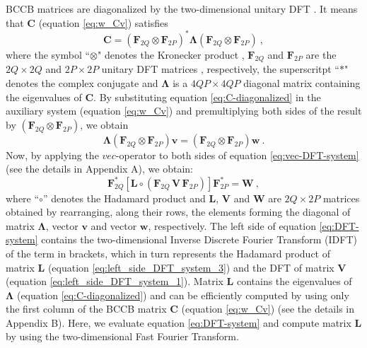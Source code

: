 \documentclass[manuscript,revised]{geophysics}
\begin{document}
BCCB matrices are diagonalized by the two-dimensional unitary DFT 
\citep[][ p. 185]{davis1979}. It means that $\mathbf{C}$ (equation \ref{eq:w_Cv}) 
satisfies 
\begin{equation}
\mathbf{C} = 
\left(\mathbf{F}_{2Q} \otimes \mathbf{F}_{2P} \right)^{\ast} 
\boldsymbol{\Lambda}
\left(\mathbf{F}_{2Q} \otimes \mathbf{F}_{2P} \right) \: ,
\label{eq:C-diagonalized}
\end{equation}
where the symbol ``$\otimes$" denotes the Kronecker product \citep{neudecker1969},
$\mathbf{F}_{2Q}$ and $\mathbf{F}_{2P}$ are the $2Q \times 2Q$ and $2P \times 2P$ 
unitary DFT matrices \citep[][ p. 31]{davis1979}, respectively, the superscritpt 
``$\ast$" denotes the complex conjugate and $\boldsymbol{\Lambda}$ is a 
$4QP \times 4QP$ diagonal matrix containing the eigenvalues of $\mathbf{C}$.
By substituting equation \ref{eq:C-diagonalized} in the auxiliary system 
(equation \ref{eq:w_Cv}) and premultiplying both
sides of the result by $\left(\mathbf{F}_{2Q} \otimes \mathbf{F}_{2P} \right)$, 
we obtain
\begin{equation}
\boldsymbol{\Lambda} \left(\mathbf{F}_{2Q} \otimes \mathbf{F}_{2P} \right) 
\mathbf{v} = \left(\mathbf{F}_{2Q} \otimes \mathbf{F}_{2P} \right) 
\mathbf{w} \: .
\label{eq:vec-DFT-system}
\end{equation}
Now, by applying the $vec$-operator to both sides of equation \ref{eq:vec-DFT-system} 
(see the details in Appendix A), we obtain:
\begin{equation}
\mathbf{F}_{2Q}^{\ast} \left[ 
\mathbf{L} \circ \left(\mathbf{F}_{2Q} \, \mathbf{V} \, \mathbf{F}_{2P} \right) 
\right] \mathbf{F}_{2P}^{\ast} = \mathbf{W} \: ,
\label{eq:DFT-system}
\end{equation}
where ``$\circ$'' denotes the Hadamard product \citep[][ p. 298]{horn_johnson1991} and 
$\mathbf{L}$, $\mathbf{V}$ and $\mathbf{W}$ are $2Q \times 2P$ matrices obtained 
by rearranging, along their rows, the elements forming the diagonal of matrix 
$\boldsymbol{\Lambda}$, vector $\mathbf{v}$ and vector $\mathbf{w}$, respectively.
The left side of equation \ref{eq:DFT-system} contains the two-dimensional 
Inverse Discrete Fourier Transform (IDFT) of the term in brackets, which in turn
represents the Hadamard product of matrix $\mathbf{L}$ (equation \ref{eq:left_side_DFT_system_3})
and the DFT of matrix $\mathbf{V}$ (equation \ref{eq:left_side_DFT_system_1}).
Matrix $\mathbf{L}$ contains the eigenvalues 
of $\boldsymbol{\Lambda}$ (equation \ref{eq:C-diagonalized}) and can be 
efficiently computed by using only the first column of the BCCB matrix 
$\mathbf{C}$ (equation \ref{eq:w_Cv}) (see the details in Appendix B).
Here, we evaluate equation \ref{eq:DFT-system} and compute matrix $\mathbf{L}$
by using the two-dimensional Fast Fourier Transform.
\end{document}
